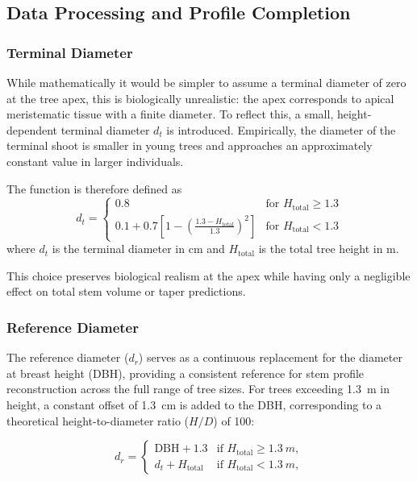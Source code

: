 \documentclass[twocolumn, bibliography=totoc]{scrartcl}
\begin{document}
\subsection{Data Processing and Profile Completion}

\subsubsection{Terminal Diameter}

While mathematically it would be simpler to assume a terminal diameter of zero at the tree apex, this is biologically unrealistic: the apex corresponds to apical meristematic tissue with a finite diameter. To reflect this, a small, height-dependent terminal diameter $d_t$ is introduced. Empirically, the diameter of the terminal shoot is smaller in young trees and approaches an approximately constant value in larger individuals.  

The function is therefore defined as
\begin{equation}
d_t =
\begin{cases}
0.8 & \text{for } H_{\text{total}} \geq 1.3 \\
0.1 + 0.7 \left[ 1 - \left( \frac{1.3 - H_{\text{total}}}{1.3} \right)^2 \right] & \text{for } H_{\text{total}} < 1.3
\end{cases}
\end{equation}
where $d_t$ is the terminal diameter in \unit{cm} and $H_{\text{total}}$ is the total tree height in \unit{m}.

This choice preserves biological realism at the apex while having only a negligible effect on total stem volume or taper predictions.


\subsubsection{Reference Diameter}

The reference diameter ($d_r$) serves as a continuous replacement for the diameter at breast height (DBH), providing a consistent reference for stem profile reconstruction across the full range of tree sizes. For trees exceeding \qty{1.3}{m} in height, a constant offset of \qty{1.3}{cm} is added to the DBH, corresponding to a theoretical height-to-diameter ratio ($H/D$) of 100:

\begin{equation}
d_r =
\begin{cases}
\text{DBH} + 1.3 & \text{if } H_{\text{total}} \geq \qty{1.3}{m}, \\
d_t + H_{\text{total}} & \text{if } H_{\text{total}} < \qty{1.3}{m},
\end{cases}
\end{equation}
\end{document}
